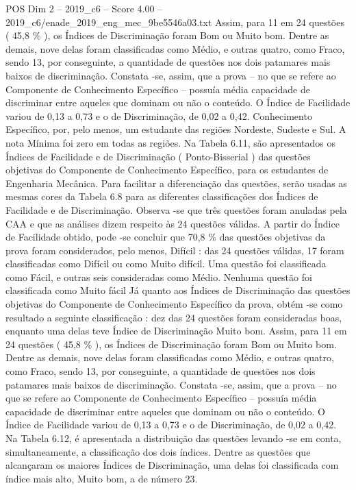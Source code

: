 \begin{textsample}{POS Dim 2 – 2019\_c6 – Score 4.00 – 2019\_c6/enade\_2019\_eng\_mec\_9be5546a03.txt}
Assim, para 11 em 24 questões ( 45,8 \% ), os Índices de Discriminação foram Bom ou Muito bom.
Dentre as demais, nove delas foram classificadas como Médio, e outras quatro, como Fraco, sendo 13, por conseguinte, a quantidade de questões nos dois patamares mais baixos de discriminação.
Constata -se, assim, que a prova – no que se refere ao Componente de Conhecimento Específico – possuía média capacidade de discriminar entre aqueles que dominam ou não o conteúdo.
O Índice de Facilidade variou de 0,13 a 0,73 e o de Discriminação, de 0,02 a 0,42.
Conhecimento Específico, por, pelo menos, um estudante das regiões Nordeste, Sudeste e Sul.
A nota Mínima foi zero em todas as regiões.
Na Tabela 6.11, são apresentados os Índices de Facilidade e de Discriminação ( Ponto-Bisserial ) das questões objetivas do Componente de Conhecimento Específico, para os estudantes de Engenharia Mecânica.
Para facilitar a diferenciação das questões, serão usadas as mesmas cores da Tabela 6.8 para as diferentes classificações dos Índices de Facilidade e de Discriminação.
Observa -se que três questões foram anuladas pela CAA e que as análises dizem respeito às 24 questões válidas.
A partir do Índice de Facilidade obtido, pode -se concluir que 70,8 \% das questões objetivas da prova foram considerados, pelo menos, Difícil : das 24 questões válidas, 17 foram classificadas como Difícil ou como Muito difícil.
Uma questão foi classificada como Fácil, e outras seis consideradas como Médio.
Nenhuma questão foi classificada como Muito fácil Já quanto aos Índices de Discriminação das questões objetivas do Componente de Conhecimento Específico da prova, obtém -se como resultado a seguinte classificação : dez das 24 questões foram consideradas boas, enquanto uma delas teve Índice de Discriminação Muito bom.
Assim, para 11 em 24 questões ( 45,8 \% ), os Índices de Discriminação foram Bom ou Muito bom.
Dentre as demais, nove delas foram classificadas como Médio, e outras quatro, como Fraco, sendo 13, por conseguinte, a quantidade de questões nos dois patamares mais baixos de discriminação.
Constata -se, assim, que a prova – no que se refere ao Componente de Conhecimento Específico – possuía média capacidade de discriminar entre aqueles que dominam ou não o conteúdo.
O Índice de Facilidade variou de 0,13 a 0,73 e o de Discriminação, de 0,02 a 0,42.
Na Tabela 6.12, é apresentada a distribuição das questões levando -se em conta, simultaneamente, a classificação dos dois índices.
Dentre as questões que alcançaram os maiores Índices de Discriminação, uma delas foi classificada com índice mais alto, Muito bom, a de número 23.

\end{textsample}
